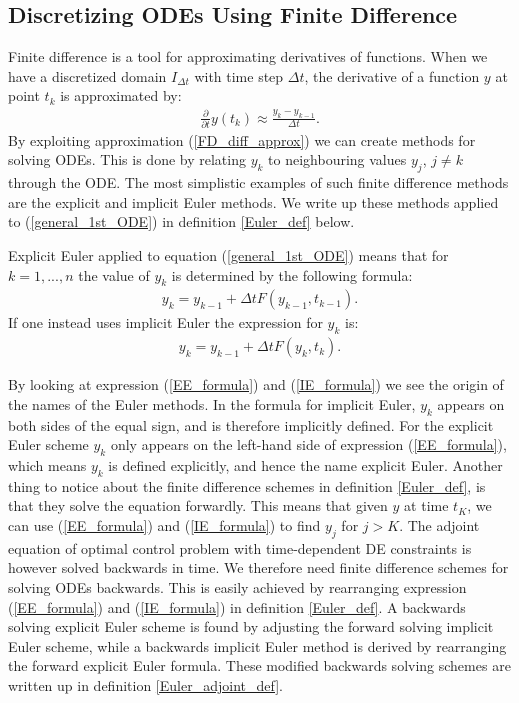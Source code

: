 \subsection{Discretizing ODEs Using Finite Difference} \label{FD_sub_sec}
Finite difference is a tool for approximating derivatives of functions. When we have a discretized domain $I_{\Delta t}$ with time step $\Delta t$, the derivative of a function $y$ at point $t_k$ is approximated by:
\begin{align}
\frac{\partial}{\partial t} y(t_k) \approx \frac{y_k-y_{k-1}}{\Delta t}. \label{FD_diff_approx}
\end{align}
By exploiting approximation (\ref{FD_diff_approx}) we can create methods for solving ODEs. This is done by relating $y_k$ to neighbouring values $y_j$, $j\neq k$ through the ODE. The most simplistic examples of such finite difference methods are the explicit and implicit Euler methods. We write up these methods applied to (\ref{general_1st_ODE}) in definition \ref{Euler_def} below.
\begin{definition} \label{Euler_def}
Explicit Euler applied to equation (\ref{general_1st_ODE}) means that for $k=1,...,n$ the value of $y_k$ is determined by the following formula:
\begin{align}
y_k = y_{k-1} +\Delta tF(y_{k-1},t_{k-1}).\label{EE_formula}
\end{align} 
If one instead uses implicit Euler the expression for $y_k$ is:
\begin{align}
y_k = y_{k-1} +\Delta tF(y_{k},t_{k}). \label{IE_formula}
\end{align}
\end{definition}
\noindent
By looking at expression (\ref{EE_formula}) and (\ref{IE_formula}) we see the origin of the names of the Euler methods. In the formula for implicit Euler, $y_k$ appears on both sides of the equal sign, and is therefore implicitly defined. For the explicit Euler scheme $y_k$ only appears on the left-hand side of expression (\ref{EE_formula}), which means $y_k$ is defined explicitly, and hence the name explicit Euler. Another thing to notice about the finite difference schemes in definition \ref{Euler_def}, is that they solve the equation forwardly. This means that given $y$ at time $t_K$, we can use (\ref{EE_formula}) and (\ref{IE_formula}) to find $y_j$ for $j>K$. The adjoint equation of optimal control problem with time-dependent DE constraints is however solved backwards in time. We therefore need finite difference schemes for solving ODEs backwards. This is easily achieved by rearranging expression (\ref{EE_formula}) and (\ref{IE_formula}) in definition \ref{Euler_def}. A backwards solving explicit Euler scheme is found by adjusting the forward solving implicit Euler scheme, while a backwards implicit Euler method is derived by rearranging the forward explicit Euler formula. These modified backwards solving schemes are written up in definition \ref{Euler_adjoint_def}. 
